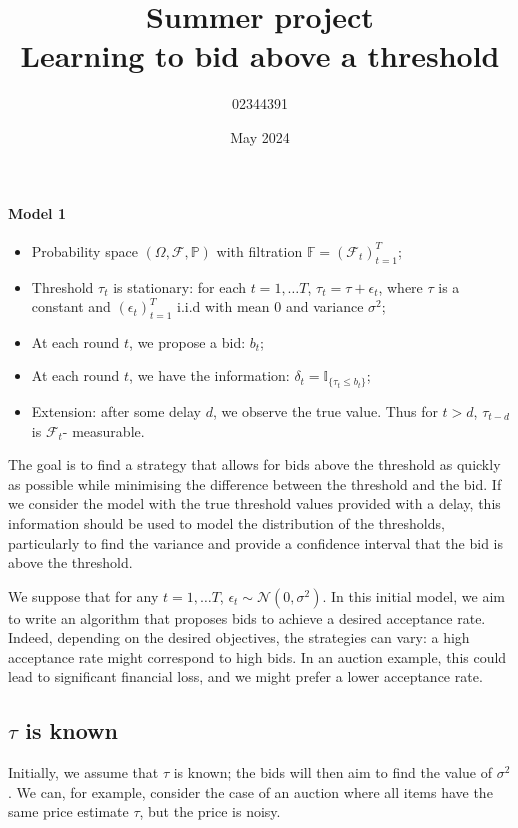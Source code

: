 \documentclass[11pt]{article}
\title{%
  Summer project \\
  \large Learning to bid above a threshold}
\date{May 2024}
\author{02344391}
\begin{document}
\maketitle

\paragraph*{Model 1}

\begin{itemize}
  \item Probability space $(\Omega, \mathcal{F}, \mathbb{P})$ with filtration $\mathbb{F} = (\mathcal{F}_t)_{t=1}^T$;
  \item Threshold $\tau_t$ is stationary: for each $t = 1, \dots T$, $\tau_t = \tau + \epsilon_t$, where $\tau$ is a constant
and $(\epsilon_t)_{t = 1}^T$ i.i.d with mean $0$ and variance $\sigma^2$;
  \item At each round $t$, we propose a bid: $b_t$;
  \item At each round $t$, we have the information: $\delta_t = \mathbb{I}_{\{\tau_t \leq b_t\}}$;
  \item Extension: after some delay $d$, we observe the true value. Thus for $t > d$, $\tau_{t-d}$ is $\mathcal{F}_t$- measurable.
\end{itemize}

The goal is to find a strategy that allows for bids above the threshold as quickly as possible while minimising the difference 
between the threshold and the bid. 
If we consider the model with the true threshold values provided with a delay, this information should be used to model the 
distribution of the thresholds, particularly to find the variance and provide a confidence interval that the bid is above the threshold.

We suppose that for any $t = 1, \dots T$, $\epsilon_t \sim \mathcal{N}(0, \sigma^2)$. In this initial model, we aim to write an algorithm that proposes bids to achieve a desired acceptance rate. Indeed, depending on the 
desired objectives, the strategies can vary: a high acceptance rate might correspond to high bids. In an auction example, this could 
lead to significant financial loss, and we might prefer a lower acceptance rate.

\subsection*{$\tau$ is known}

Initially, we assume that $\tau$ is known; the bids will then aim to find the value of $\sigma^2$.
We can, for example, consider the case of an auction where all items have the same price estimate $\tau$, but the price is noisy.
\end{document}
